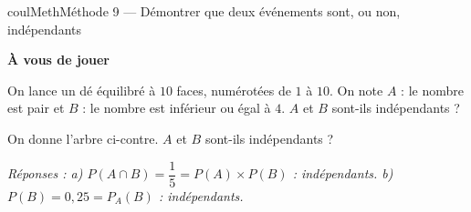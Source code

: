 \documentclass[11pt,a4paper]{article}
\makeatletter
\newcounter{lycee@signet}
\newcommand{\signet}[3][]{\stepcounter{lycee@signet}%
  \edef\lycee@dest{\if\relax\detokenize{#1}\relax
    signet.\arabic{lycee@signet}\else#1\fi}%
  \hypertarget{\lycee@dest}{}\bookmark[level=#2,dest=\lycee@dest]{#3}}
\newcounter{methode}
\newenvironment{methodebox}[1][Méthode]{\stepcounter{methode}%
  \begin{boitecours}[phantom={\signet[methode-\arabic{methode}]{2}{#1}}]{coulMeth}{#1}}%
  {\end{boitecours}}
\newcommand{\etape}[1]{\par\smallskip\textbf{\color{coulMeth}#1}\par\nobreak\smallskip}
\newcommand{\reponse}[1]{\par\smallskip
  {\footnotesize\itshape\color{black!55}Réponses : #1}}
\makeatother
\begin{document}
\begin{methodebox}[Méthode 9 --- Démontrer que deux événements sont, ou non, indépendants]
\etape{À vous de jouer}
\begin{minipage}[c]{0.44\linewidth}\raggedright
\begin{questions}[label=\alph*)]
  \item On lance un dé équilibré à $10$ faces, numérotées de $1$ à $10$. On note
    $A$ : \og le nombre est pair\fg{} et $B$ : \og le nombre est inférieur ou égal à
    $4$\fg. $A$ et $B$ sont-ils indépendants ?
  \item On donne l'arbre ci-contre. $A$ et $B$ sont-ils indépendants ?
\end{questions}
\end{minipage}\hfill
\begin{minipage}[c]{0.54\linewidth}\centering
{}
\end{minipage}
\reponse{a) $P(A\cap B)=\dfrac{1}{5}=P(A)\times P(B)$ : indépendants.\; b)~$P(B)=0{,}25
=P_{A}(B)$ : indépendants.}
\end{methodebox}
\end{document}
